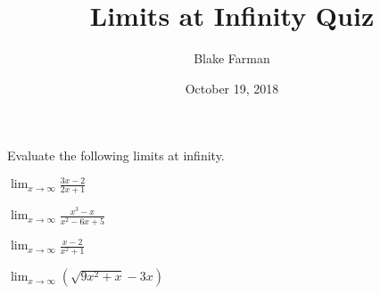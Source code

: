 \documentclass[10pt]{amsart}
\title[Limits at Infinity]{Limits at Infinity Quiz}
\date{October 19, 2018}
\author{Blake Farman}
\begin{document}
\maketitle

\makenameslot

Evaluate the following limits at infinity.
\begin{multicols}{2}
  \begin{thm}
    \(\displaystyle{\lim_{x \to \infty} \frac{3x - 2}{2x + 1}}\)
  \end{thm}
    \begin{thm}
    \(\displaystyle{\lim_{x \to \infty} \frac{x^3 - x}{x^2 - 6x + 5}}\)
    \end{thm}
\end{multicols}

\vspace{2in}

\begin{multicols}{2}
  \begin{thm}
    \(\displaystyle{\lim_{x \to \infty} \frac{x - 2}{x^2 + 1}}\)
  \end{thm}
  \begin{thm}
  \(\displaystyle{\lim_{x \to \infty} \left(\sqrt{9x^2 + x} - 3x\right)}\)
\end{thm}
\end{multicols}
\end{document}

